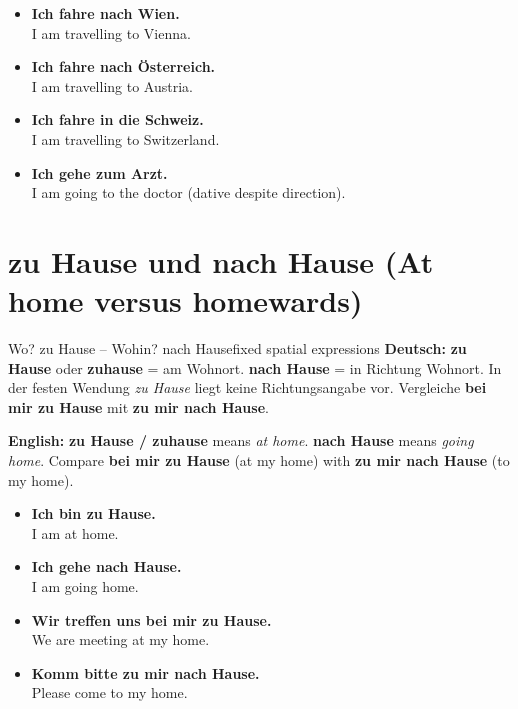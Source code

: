 \documentclass[a4paper,11pt]{article}
\newcommand{\GermanText}[1]{\textbf{Deutsch: }#1\par}
\newcommand{\EnglishText}[1]{{\small\color{SoftGray}\textbf{English: }#1\par}}
\newcommand{\ExampleItem}[2]{\item \textbf{#1}\\{\small\color{SoftGray}#2}}
\begin{document}
\begin{exbox}\begin{itemize}
\ExampleItem{Ich fahre nach Wien.}{I am travelling to Vienna.}
\ExampleItem{Ich fahre nach Österreich.}{I am travelling to Austria.}
\ExampleItem{Ich fahre in die Schweiz.}{I am travelling to Switzerland.}
\ExampleItem{Ich gehe zum Arzt.}{I am going to the doctor (dative despite direction).}
\end{itemize}\end{exbox}

\section{zu Hause und nach Hause (At home versus homewards)}
\begin{grammarentry}{Wo? zu Hause -- Wohin? nach Hause}{fixed spatial expressions}
\GermanText{\textbf{zu Hause} oder \textbf{zuhause} = am Wohnort. \textbf{nach Hause} = in Richtung Wohnort. In der festen Wendung \emph{zu Hause} liegt keine Richtungsangabe vor. Vergleiche \textbf{bei mir zu Hause} mit \textbf{zu mir nach Hause}.}
\EnglishText{\textbf{zu Hause / zuhause} means \emph{at home}. \textbf{nach Hause} means \emph{going home}. Compare \textbf{bei mir zu Hause} (at my home) with \textbf{zu mir nach Hause} (to my home).}
\end{grammarentry}
\begin{exbox}\begin{itemize}
\ExampleItem{Ich bin zu Hause.}{I am at home.}
\ExampleItem{Ich gehe nach Hause.}{I am going home.}
\ExampleItem{Wir treffen uns bei mir zu Hause.}{We are meeting at my home.}
\ExampleItem{Komm bitte zu mir nach Hause.}{Please come to my home.}
\end{itemize}\end{exbox}
\end{document}
